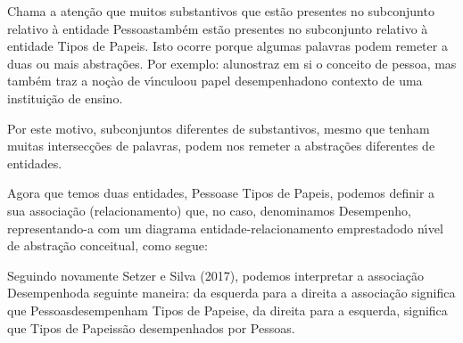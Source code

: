 \documentclass[
12pt,		%
openright,	%
twoside,  %
a4paper,			%
chapter=TITLE,		%
english,			%
french,				%
spanish,			%
brazil				%
]{USPSC-classe/USPSC}
\begin{document}
Chama a aten\c{c}\~ao que muitos substantivos que est\~ao presentes no subconjunto relativo \`a entidade \textquotedbl Pessoas\textquotedbl  tamb\'em est\~ao presentes no subconjunto relativo \`a entidade \textquotedbl Tipos de Papeis\textquotedbl . Isto ocorre porque algumas palavras podem remeter a duas ou mais abstra\c{c}\~oes. Por exemplo: \textquotedbl alunos\textquotedbl  traz em si o conceito de \textquotedbl pessoa\textquotedbl , mas tamb\'em traz a no\c{c}\`ao de \textquotedbl v\'{\i}nculo\textquotedbl  ou \textquotedbl papel desempenhado\textquotedbl  no contexto de uma institui\c{c}\~ao de ensino.










Por este motivo, subconjuntos diferentes de substantivos, mesmo que tenham muitas intersec\c{c}\~oes de palavras, podem nos remeter a abstra\c{c}\~oes diferentes de entidades.










Agora que temos duas entidades, \textquotedbl Pessoas\textquotedbl  e \textquotedbl Tipos de Papeis\textquotedbl , podemos definir a sua associa\c{c}\~ao (relacionamento) que, no caso, denominamos \textquotedbl Desempenho\textquotedbl , representando-a com um diagrama entidade-relacionamento \textquotedbl emprestado\textquotedbl  do n\'{\i}vel de abstra\c{c}\~ao conceitual, como segue:












Seguindo novamente  Setzer e Silva (2017), podemos interpretar a associa\c{c}\~ao \textquotedbl Desempenho\textquotedbl  da seguinte maneira: da esquerda para a direita a associa\c{c}\~ao significa que \textquotedbl Pessoas\textquotedbl  desempenham \textquotedbl Tipos de Papeis\textquotedbl  e, da direita para a esquerda, significa que \textquotedbl Tipos de Papeis\textquotedbl  s\~ao desempenhados por \textquotedbl Pessoas\textquotedbl .
\end{document}
